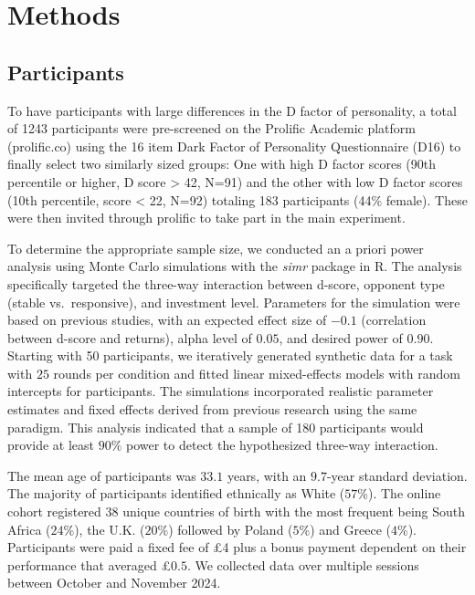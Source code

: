 \documentclass[
]{article}
\begin{document}
\section{Methods}\label{methods}

\subsection{Participants}\label{participants}

To have participants with large differences in the D factor of personality, a total of 1243
participants were pre-screened on the Prolific Academic platform
(prolific.co) using the 16 item Dark Factor of Personality Questionnaire (D16) to
finally select two similarly sized groups: One with high D factor scores (90th percentile or higher, D score
\textgreater{} 42, N=91) and the other with low D factor scores (10th percentile, score \textless{} 22, N=92)
totaling 183 participants (44\% female). These were then invited through
prolific to take part in the main experiment.

To determine the appropriate sample size, we conducted an a priori power analysis using Monte Carlo simulations with the \emph{simr} package in R. The analysis specifically targeted the three-way interaction between d-score, opponent type (stable vs.~responsive), and investment level. Parameters for the simulation were based on previous studies, with an expected effect size of \(-0.1\) (correlation between d-score and returns), alpha level of \(0.05\), and desired power of \(0.90\). Starting with 50 participants, we iteratively generated synthetic data for a task with \(25\) rounds per condition and fitted linear mixed-effects models with random intercepts for participants. The simulations incorporated realistic parameter estimates and fixed effects derived from previous research using the same paradigm. This analysis indicated that a sample of 180 participants would provide at least \(90\%\) power to detect the hypothesized three-way interaction.

The mean age of participants was \(33.1\) years, with an \(9.7\)-year standard deviation. The majority of participants identified ethnically as White (\(57\)\%). The online cohort registered \(38\) unique countries of birth with the most frequent being South Africa (\(24\)\%), the U.K. (\(20\)\%) followed by Poland (\(5\)\%) and Greece (\(4\)\%). Participants were paid a fixed fee of £4 plus a bonus payment dependent on their performance that averaged £\(0.5\). We collected data over multiple sessions between October and November 2024.
\end{document}
